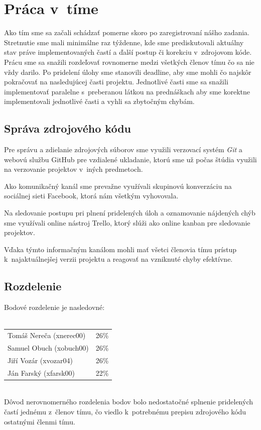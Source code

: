 \documentclass{article}
\begin{document}
    \section{Práca v~tíme}
    Ako tím sme sa začali schádzať pomerne skoro po zaregistrovaní nášho zadania. Stretnutie sme mali 
    minimálne raz týždenne, kde sme prediskutovali aktuálny stav práve implementovaných častí 
    a ďalší postup či korekciu v~zdrojovom kóde. Prácu sme sa snažili rozdeľovať rovnomerne medzi 
    všetkých členov tímu čo sa nie vždy darilo. Po pridelení úlohy sme stanovili deadline, aby sme 
    mohli čo najskôr pokračovať na nasledujúcej časti projektu. Jednotlivé časti sme sa snažili 
    implementovať paralelne s~preberanou látkou na prednáškach aby sme korektne implementovali
    jednotlivé časti a vyhli sa zbytočným chybám.

        \subsection{Správa zdrojového kódu}
        Pre správu a zdielanie zdrojových súborov sme využili verzovací systém \emph{Git} a webovú službu GitHub pre vzdialené ukladanie, ktorú sme už 
        počas štúdia využili na verzovanie projektov v~iných predmetoch.
        
        Ako komunikačný kanál sme 
        prevažne využívali skupinovú konverzáciu na sociálnej sieti Facebook, ktorá nám všetkým 
        vyhovovala.
        
        Na sledovanie postupu pri plnení pridelených úloh a oznamovanie nájdených chýb 
        sme využívali online nástroj Trello, ktorý slúži ako online kanban pre sledovanie projektov. 
        
        Vďaka týmto informačným kanálom mohli mať všetci členovia tímu prístup k~najaktuálnejšej
        verzii projektu a reagovať na vzniknuté chyby efektívne.

        \newpage
        \subsection{Rozdelenie}
        \noindent
        Bodové rozdelenie je nasledovné:\\~\\
        \begin{tabular}{l l}
            Tomáš Nereča (xnerec00) & 26\% \\
            Samuel Obuch (xobuch00) & 26\% \\
            Jiří Vozár (xvozar04)   & 26\% \\
            Ján Farský (xfarsk00)   & 22\% \\
        \end{tabular} \\
        Dôvod nerovnomerného rozdelenia bodov bolo nedostatočné splnenie pridelených častí jednému 
        z~členov tímu, čo viedlo k~potrebnému prepisu zdrojového kódu ostatnými členmi tímu.
\end{document}
